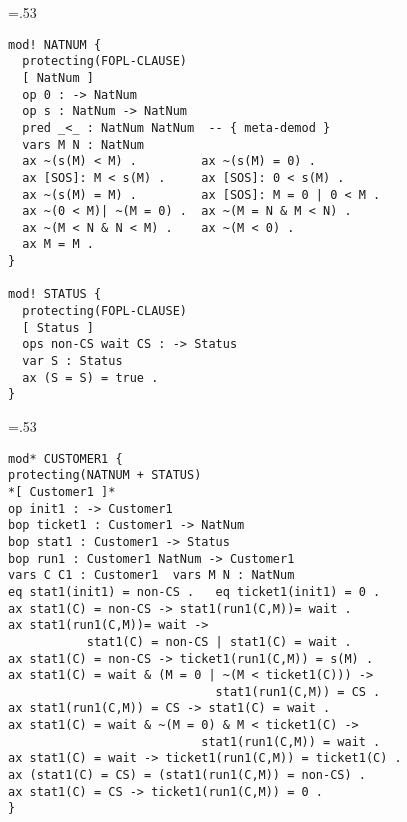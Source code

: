 \documentclass[landscape]{slides}
\begin{document}
\begin{slide}\large\parskip=0pt\baselineskip=.53\baselineskip
\vspace*{-2cm}
\begin{verbatim}
mod! NATNUM {
  protecting(FOPL-CLAUSE)
  [ NatNum ]
  op 0 : -> NatNum
  op s : NatNum -> NatNum
  pred _<_ : NatNum NatNum  -- { meta-demod }
  vars M N : NatNum
  ax ~(s(M) < M) .         ax ~(s(M) = 0) .
  ax [SOS]: M < s(M) .     ax [SOS]: 0 < s(M) .
  ax ~(s(M) = M) .         ax [SOS]: M = 0 | 0 < M .
  ax ~(0 < M)| ~(M = 0) .  ax ~(M = N & M < N) .
  ax ~(M < N & N < M) .    ax ~(M < 0) .
  ax M = M .
}

mod! STATUS {
  protecting(FOPL-CLAUSE)
  [ Status ]
  ops non-CS wait CS : -> Status
  var S : Status
  ax (S = S) = true .
}
\end{verbatim}
\end{slide}

\begin{slide}\large\parskip=0pt\baselineskip=.53\baselineskip
\vspace*{-2cm}
\begin{verbatim}
mod* CUSTOMER1 {
protecting(NATNUM + STATUS)
*[ Customer1 ]*
op init1 : -> Customer1
bop ticket1 : Customer1 -> NatNum
bop stat1 : Customer1 -> Status
bop run1 : Customer1 NatNum -> Customer1
vars C C1 : Customer1  vars M N : NatNum
eq stat1(init1) = non-CS .   eq ticket1(init1) = 0 .
ax stat1(C) = non-CS -> stat1(run1(C,M))= wait .
ax stat1(run1(C,M))= wait ->
           stat1(C) = non-CS | stat1(C) = wait .
ax stat1(C) = non-CS -> ticket1(run1(C,M)) = s(M) .
ax stat1(C) = wait & (M = 0 | ~(M < ticket1(C))) ->
                             stat1(run1(C,M)) = CS .
ax stat1(run1(C,M)) = CS -> stat1(C) = wait .
ax stat1(C) = wait & ~(M = 0) & M < ticket1(C) ->
                           stat1(run1(C,M)) = wait .
ax stat1(C) = wait -> ticket1(run1(C,M)) = ticket1(C) .
ax (stat1(C) = CS) = (stat1(run1(C,M)) = non-CS) .
ax stat1(C) = CS -> ticket1(run1(C,M)) = 0 .
}
\end{verbatim}
\end{slide}
\end{document}
